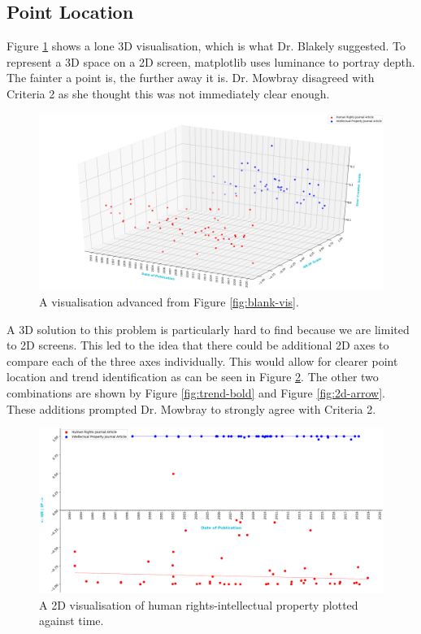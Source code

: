 		\subsection{Point Location}
			Figure \ref{fig:3d-vis} shows a lone 3D visualisation, which is what Dr. Blakely suggested. To represent a 3D space on a 2D screen, matplotlib uses luminance to portray depth. The fainter a point is, the further away it is. Dr. Mowbray disagreed with Criteria 2 as she thought this was not immediately clear enough.			
			\begin{figure}
    			\centering
    			\includegraphics[width=0.9\linewidth]{resources/images/3d_points.png}
    			\caption{A visualisation advanced from Figure \ref{fig:blank-vis}.}
    			\label{fig:3d-vis}
			\end{figure}

			A 3D solution to this problem is particularly hard to find because we are limited to 2D screens. This led to the idea that there could be additional 2D axes to compare each of the three axes individually. This would allow for clearer point location and trend identification as can be seen in Figure \ref{fig:hr-ip}. The other two combinations are shown by Figure \ref{fig:trend-bold} and Figure \ref{fig:2d-arrow}. These additions prompted Dr. Mowbray to strongly agree with Criteria 2.
			\begin{figure}
    			\centering
    			\includegraphics[width=0.9\linewidth]{resources/images/hr_ip.png}
    			\caption{A 2D visualisation of human rights-intellectual property plotted against time.}
    			\label{fig:hr-ip}
			\end{figure}
			
